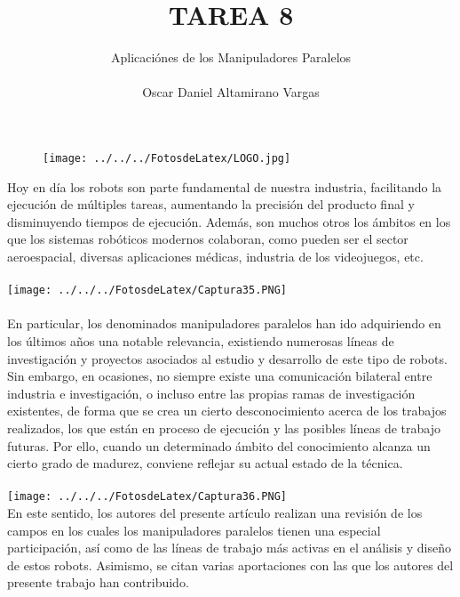 \documentclass[12pt]{article}
\title{TAREA 8}
\author{Aplicaciónes de los Manipuladores Paralelos \\ \\ Oscar Daniel Altamirano Vargas\\}
\begin{document}
 
\maketitle
\begin{figure}[hbtp]
\centering
\texttt{[image: ../../../FotosdeLatex/LOGO.jpg]}
\end{figure}
\pagebreak

Hoy en día los robots son parte fundamental de nuestra industria, facilitando la ejecución de múltiples tareas, aumentando la precisión del producto final y disminuyendo tiempos de ejecución. Además, son muchos otros los ámbitos en los que los sistemas robóticos modernos colaboran, como pueden ser el sector aeroespacial, diversas aplicaciones médicas, industria de los videojuegos, etc.\cite{2007} \\ \\
\texttt{[image: ../../../FotosdeLatex/Captura35.PNG]} \\ \\
 En particular, los denominados manipuladores paralelos han ido adquiriendo en los últimos años una notable relevancia, existiendo numerosas líneas de investigación y proyectos asociados al estudio y desarrollo de este tipo de robots. Sin embargo, en ocasiones, no siempre existe una comunicación bilateral entre industria e investigación, o incluso entre las propias ramas de investigación existentes, de forma que se crea un cierto desconocimiento acerca de los trabajos realizados, los que están en proceso de ejecución y las posibles líneas de trabajo futuras. Por ello, cuando un determinado ámbito del conocimiento alcanza un cierto grado de madurez, conviene reflejar su actual estado de la técnica.\\ \\
 \texttt{[image: ../../../FotosdeLatex/Captura36.PNG]}\\ 
  En este sentido, los autores del presente artículo realizan una revisión de los campos en los cuales los manipuladores paralelos tienen una especial participación, así como de las líneas de trabajo más activas en el análisis y diseño de estos robots. Asimismo, se citan varias aportaciones con las que los autores del presente trabajo han contribuido. \\
  \pagebreak
\nocite{*} 


  
\end{document}
